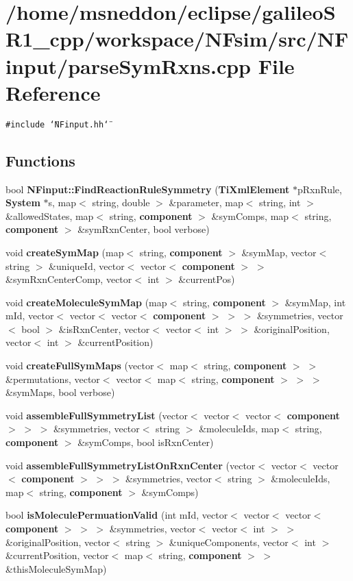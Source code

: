 \section{/home/msneddon/eclipse/galileoSR1\_\-cpp/workspace/NFsim/src/NFinput/parseSymRxns.cpp File Reference}
\label{parseSymRxns_8cpp}


{\tt \#include \char`\"{}NFinput.hh\char`\"{}}\par
\subsection*{Functions}
\begin{CompactItemize}
\item 
bool {\bf NFinput::FindReactionRuleSymmetry} ({\bf TiXmlElement} $\ast$pRxnRule, {\bf System} $\ast$s, map$<$ string, double $>$ \&parameter, map$<$ string, int $>$ \&allowedStates, map$<$ string, {\bf component} $>$ \&symComps, map$<$ string, {\bf component} $>$ \&symRxnCenter, bool verbose)
\item 
void {\bf createSymMap} (map$<$ string, {\bf component} $>$ \&symMap, vector$<$ string $>$ \&uniqueId, vector$<$ vector$<$ {\bf component} $>$ $>$ \&symRxnCenterComp, vector$<$ int $>$ \&currentPos)
\item 
void {\bf createMoleculeSymMap} (map$<$ string, {\bf component} $>$ \&symMap, int mId, vector$<$ vector$<$ vector$<$ {\bf component} $>$ $>$ $>$ \&symmetries, vector$<$ bool $>$ \&isRxnCenter, vector$<$ vector$<$ int $>$ $>$ \&originalPosition, vector$<$ int $>$ \&currentPosition)
\item 
void {\bf createFullSymMaps} (vector$<$ map$<$ string, {\bf component} $>$ $>$ \&permutations, vector$<$ vector$<$ map$<$ string, {\bf component} $>$ $>$ $>$ \&symMaps, bool verbose)
\item 
void {\bf assembleFullSymmetryList} (vector$<$ vector$<$ vector$<$ {\bf component} $>$ $>$ $>$ \&symmetries, vector$<$ string $>$ \&moleculeIds, map$<$ string, {\bf component} $>$ \&symComps, bool isRxnCenter)
\item 
void {\bf assembleFullSymmetryListOnRxnCenter} (vector$<$ vector$<$ vector$<$ {\bf component} $>$ $>$ $>$ \&symmetries, vector$<$ string $>$ \&moleculeIds, map$<$ string, {\bf component} $>$ \&symComps)
\item 
bool {\bf isMoleculePermuationValid} (int mId, vector$<$ vector$<$ vector$<$ {\bf component} $>$ $>$ $>$ \&symmetries, vector$<$ vector$<$ int $>$ $>$ \&originalPosition, vector$<$ string $>$ \&uniqueComponents, vector$<$ int $>$ \&currentPosition, vector$<$ map$<$ string, {\bf component} $>$ $>$ \&thisMoleculeSymMap)

\end{CompactItemize}
